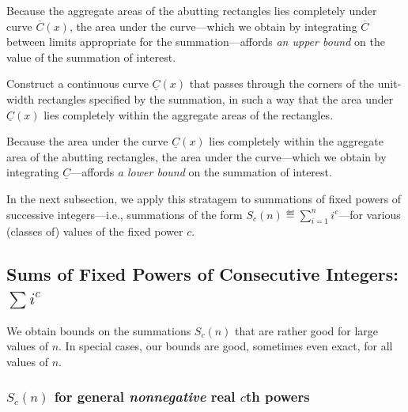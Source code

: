 \noindent {}
\medskip

Because the aggregate areas of the abutting rectangles lies completely
under curve $\overline{C}(x)$, the area under the curve---which we
obtain by integrating $\overline{C}$ between limits appropriate for
the summation---affords {\em an upper bound} on the value of the
summation of interest.

\medskip

%
Construct a continuous curve $\underline{C}(x)$ that passes through
the corners of the unit-width rectangles
specified by the summation, in such a way that the area under
$\underline{C}(x)$ lies completely within the aggregate areas of the 
rectangles.
\medskip

\noindent {}
\bigskip

Because the area under the curve $\underline{C}(x)$ lies completely
within the aggregate area of the abutting rectangles, the area under
the curve---which we obtain by integrating $\underline{C}$---affords
{\em a lower bound} on the summation of interest.

\medskip

In the next subsection, we apply this stratagem to summations of fixed
powers of successive integers---i.e., summations of the form
$\displaystyle S_c(n) \eqdef \sum_{i=1}^n i^c$---for various (classes
of) values of the fixed power $c$.


\subsection{Sums of Fixed Powers of Consecutive Integers: $\sum i^c$}
\label{sec:sum-of-i2c}

We obtain bounds on the summations $S_c(n)$ that are rather good for
large values of $n$.  In special cases, our bounds are good, sometimes
even exact, for all values of $n$.

\subsubsection{$S_c(n)$ for general {\em nonnegative} real $c$th powers}
\label{sec:sum-of-i2c>0}

